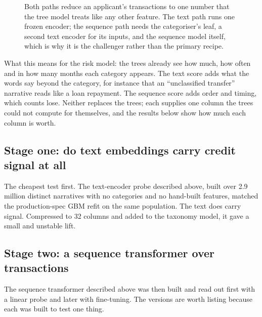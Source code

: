 \begin{figure}[H]
{}
\caption*{Both paths reduce an applicant's transactions to one number that the tree model treats like any other feature. The text path runs one frozen encoder; the sequence path needs the categoriser's leaf, a second text encoder for its inputs, and the sequence model itself, which is why it is the challenger rather than the primary recipe.}
\end{figure}

What this means for the risk model: the trees already see how much, how often and in how many months each category appears. The text score adds what the words say beyond the category, for instance that an ``unclassified transfer'' narrative reads like a loan repayment. The sequence score adds order and timing, which counts lose. Neither replaces the trees; each supplies one column the trees could not compute for themselves, and the results below show how much each column is worth.

\subsection{Stage one: do text embeddings carry credit signal at all}
The cheapest test first. The text-encoder probe described above, built over 2.9 million distinct narratives with no categories and no hand-built features, matched the production-spec GBM refit on the same population. The text does carry signal. Compressed to 32 columns and added to the taxonomy model, it gave a small and unstable lift.

\subsection{Stage two: a sequence transformer over transactions}
The sequence transformer described above was then built and read out first with a linear probe and later with fine-tuning. The versions are worth listing because each was built to test one thing.


